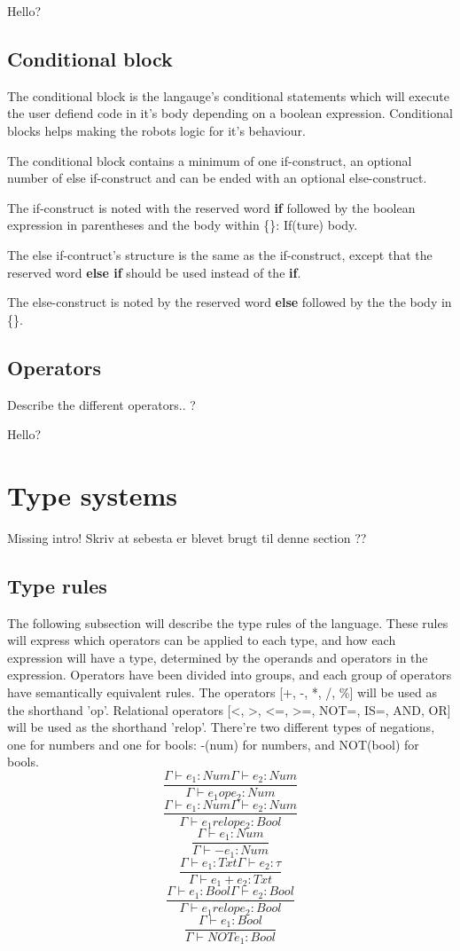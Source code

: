 \begin{defi}
Hello?
\end{defi}
\subsection{Conditional block}
The conditional block is the langauge's conditional statements which will execute the user defiend code in it's body depending on a boolean expression. Conditional blocks helps making the robots logic for it's behaviour. 

\begin{defi}
The conditional block contains a minimum of one if-construct, an optional number of else if-construct and can be ended with an optional else-construct. 

The if-construct is noted with the reserved word \textbf{if} followed by the boolean expression in parentheses and the body within \{\}: If(ture) {body}.

The else if-contruct's structure is the same as the if-construct, except that the reserved  word \textbf{else if} should be used instead of the \textbf{if}. 

The else-construct is noted by the reserved word \textbf{else} followed by the the body in \{\}.
\end{defi}
\subsection{Operators}
Describe the different operators.. ? 

\begin{defi}
Hello?
\end{defi}
\section{Type systems}
Missing intro! Skriv at sebesta er blevet brugt til denne section ??

\subsection{Type rules}
The following subsection will describe the type rules of the language. These rules will express which operators can be applied to each type, and how each expression will have a type, determined by the operands and operators in the expression.
Operators have been divided into groups, and each group of operators have semantically equivalent rules.
The operators [+, -, *, /, \%] will be used as the shorthand 'op'. Relational operators [<, >, <=, >=, NOT=, IS=, AND, OR] will be used as the shorthand 'relop'. There're two different types of negations, one for numbers and one for bools: -(num) for numbers, and NOT(bool) for bools.
\[
\dfrac{\Gamma \vdash e_1 : Num \Gamma \vdash e_2 : Num}{\Gamma \vdash e_1 op e_2 : Num}
\]
\[
\dfrac{\Gamma \vdash e_1 : Num \Gamma \vdash e_2 : Num}{\Gamma \vdash e_1 relop e_2 : Bool}
\]
\[
\dfrac{\Gamma \vdash e_1 : Num}{\Gamma \vdash -e_1 : Num}
\]
\[
\dfrac{\Gamma \vdash e_1 : Txt \Gamma \vdash e_2 : \tau}{\Gamma \vdash e_1 + e_2 : Txt}
\]
\[
\dfrac{\Gamma \vdash e_1 : Bool \Gamma \vdash e_2 : Bool}{\Gamma \vdash e_1 relop e_2 : Bool}
\]
\[
\dfrac{\Gamma \vdash e_1 : Bool}{\Gamma \vdash NOTe_1 : Bool}
\]
